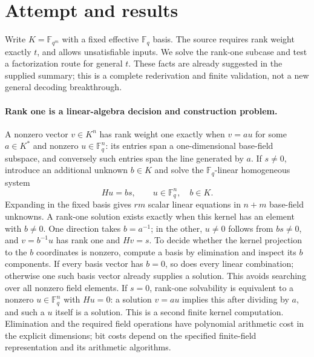 \documentclass[11pt]{article}
\begin{document}
\section{Attempt and results}
Write $K=\mathbb F_{q^m}$ with a fixed effective $\mathbb F_q$ basis.
The source requires rank weight exactly $t$, and allows unsatisfiable inputs.
We solve the rank-one subcase and test a factorization route for general $t$.
These facts are already suggested in the supplied summary; this is a complete
rederivation and finite validation, not a new general decoding breakthrough.

\paragraph{Rank one is a linear-algebra decision and construction problem.}
A nonzero vector $v\in K^n$ has rank weight one exactly when
$v=a u$ for some $a\in K^*$ and nonzero $u\in\mathbb F_q^n$:
its entries span a one-dimensional base-field subspace, and conversely such
entries span the line generated by $a$.
If $s\ne0$, introduce an additional unknown $b\in K$ and solve the
$\mathbb F_q$-linear homogeneous system
\[
H u=b s,\qquad u\in\mathbb F_q^n,\quad b\in K.
\]
Expanding in the fixed basis gives $rm$ scalar linear equations in $n+m$
base-field unknowns. A rank-one solution exists exactly when this kernel has
an element with $b\ne0$. One direction takes $b=a^{-1}$; in the other,
$u\ne0$ follows from $bs\ne0$, and $v=b^{-1}u$ has rank one and
$Hv=s$. To decide whether the kernel projection to the $b$ coordinates is
nonzero, compute a basis by elimination and inspect its $b$ components.
If every basis vector has $b=0$, so does every linear combination; otherwise
one such basis vector already supplies a solution. This avoids searching over
all nonzero field elements.
If $s=0$, rank-one solvability is equivalent to a nonzero
$u\in\mathbb F_q^n$ with $Hu=0$: a solution $v=au$ implies this after
dividing by $a$, and such a $u$ itself is a solution. This is a second finite
kernel computation. Elimination and the required field operations have
polynomial arithmetic cost in the explicit dimensions; bit costs depend on
the specified finite-field representation and its arithmetic algorithms.
\end{document}
